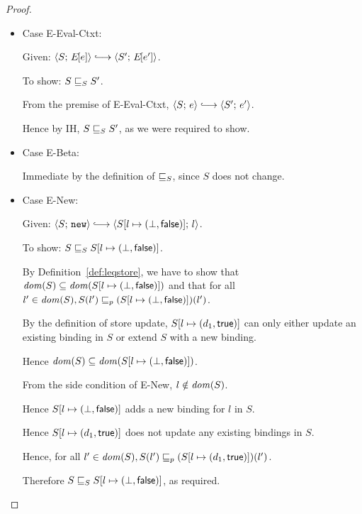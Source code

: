 \begin{proof}

  \begin{itemize}

    \item Case {\sc E-Eval-Ctxt}:

      Given: $\config{S}{\E{e}} \parstepsto \config{S'}{\E{e'}}$.

      To show: $S \sqsubseteq_S S'$.

      From the premise of {\sc E-Eval-Ctxt}, $\config{S}{e}
      \parstepsto \config{S'}{e'}$.

      Hence by IH, $S \sqsubseteq_S S'$, as we were required to show.

    \item Case {\sc E-Beta}:

      Immediate by the definition of $ \sqsubseteq_S $, since $S$ does
      not change.

    \item Case {\sc E-New}:

      Given: $\config{S}{\NEW} \parstepsto
      \config{\extS{S}{l}{\bot}{\frozenfalse}}{l}$.

      To show: $S \sqsubseteq_S S[l \mapsto (\bot, \textsf{false})]$.

      By Definition~\ref{def:leqstore}, we have to show that $\mathit{dom}(S)
      \subseteq \mathit{dom}(S[l \mapsto (\bot, \textsf{false})])$ and that for
      all $l' \in \mathit{dom}(S), \\
      S(l') \sqsubseteq_p (S[l \mapsto (\bot, \textsf{false})])(l')$.

      By the definition of store update,
      $S[l \mapsto (d_1, \textsf{true})]$ can only either update an
      existing binding in $S$ or extend $S$ with a new binding.

      Hence $\mathit{dom}(S) \subseteq \mathit{dom}(S[l \mapsto (\bot, \textsf{false})])$.

      From the side condition of {\sc E-New}, $l \notin \mathit{dom}(S)$.

      Hence $S[l \mapsto (\bot, \textsf{false})]$ adds a new binding for
      $l$ in $S$.

      Hence $S[l \mapsto (d_1, \textsf{true})]$ does not update any
      existing bindings in $S$.

      Hence, for all $l' \in \mathit{dom}(S), S(l') \sqsubseteq_p
      (S[l \mapsto (d_1, \textsf{true})])(l')$.

      Therefore $S \sqsubseteq_S S[l \mapsto (\bot, \textsf{false})]$, as
      required.


\end{itemize}
\end{proof}
